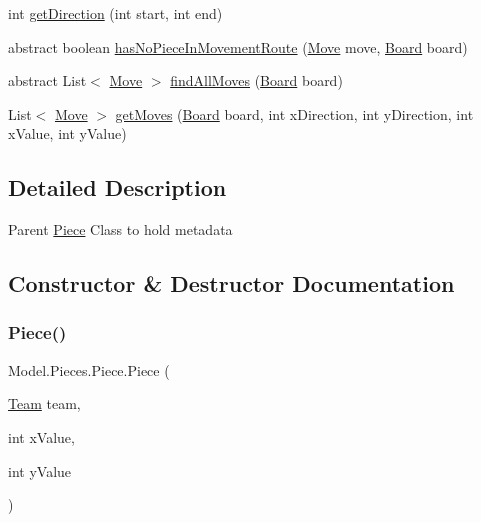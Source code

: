 \begin{DoxyCompactItemize}
\item 
int \hyperlink{class_model_1_1_pieces_1_1_piece_a236aeb47fd49b23ba097046790554ffc}{get\+Direction} (int start, int end)
\item 
abstract boolean \hyperlink{class_model_1_1_pieces_1_1_piece_a2d3dddd5af8a3d813741d3f6f4e89e10}{has\+No\+Piece\+In\+Movement\+Route} (\hyperlink{class_model_1_1_move}{Move} move, \hyperlink{class_model_1_1_board}{Board} board)
\item 
abstract List$<$ \hyperlink{class_model_1_1_move}{Move} $>$ \hyperlink{class_model_1_1_pieces_1_1_piece_a0f87f230aee0300a8b88570ce7621a36}{find\+All\+Moves} (\hyperlink{class_model_1_1_board}{Board} board)
\item 
List$<$ \hyperlink{class_model_1_1_move}{Move} $>$ \hyperlink{class_model_1_1_pieces_1_1_piece_aa066d5bc9f548630607dca38c9cd0fed}{get\+Moves} (\hyperlink{class_model_1_1_board}{Board} board, int x\+Direction, int y\+Direction, int x\+Value, int y\+Value)
\end{DoxyCompactItemize}


\subsection{Detailed Description}
Parent \hyperlink{class_model_1_1_pieces_1_1_piece}{Piece} Class to hold metadata 

\subsection{Constructor \& Destructor Documentation}
\hypertarget{class_model_1_1_pieces_1_1_piece_ad2e15ca4e0598c0ff8db23e61bf40ef2}{}\label{class_model_1_1_pieces_1_1_piece_ad2e15ca4e0598c0ff8db23e61bf40ef2} 
\subsubsection{\texorpdfstring{Piece()}{Piece()}}
{\footnotesize\ttfamily Model.\+Pieces.\+Piece.\+Piece (\begin{DoxyParamCaption}\item[{\hyperlink{class_model_1_1_team}{Team}}]{team,  }\item[{int}]{x\+Value,  }\item[{int}]{y\+Value }\end{DoxyParamCaption})}

